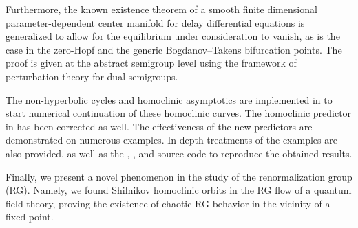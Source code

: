Furthermore, the known existence theorem of a smooth finite dimensional
parameter-dependent center manifold for delay differential equations is
generalized to allow for the equilibrium under consideration to vanish, as is
the case in the zero-Hopf and the generic Bogdanov--Takens bifurcation points.
The proof is given at the abstract semigroup level using the framework of
perturbation theory for dual semigroups.

The non-hyperbolic cycles and homoclinic asymptotics are implemented in
\DDEBIFTOOL to start numerical continuation of these homoclinic curves. The
homoclinic predictor in \MATCONT has been corrected as well. The effectiveness of
the new predictors are demonstrated on numerous examples. In-depth treatments of
the examples are also provided, as well as the \MATLAB, \PYTHON, and \JULIA
source code to reproduce the obtained results.

Finally, we present a novel phenomenon in the study of the renormalization group
(RG). Namely, we found Shilnikov homoclinic orbits in the RG flow of a quantum
field theory, proving the existence of chaotic RG-behavior in the vicinity of a
fixed point.
